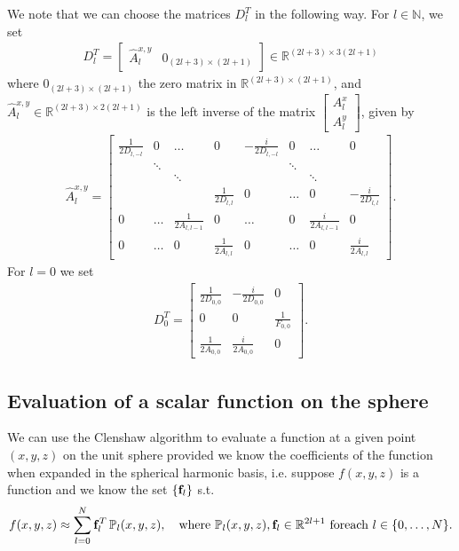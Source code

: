 \documentclass[11pt, oneside]{article}   	%
\newcommand{\R}{\mathbb{R}}
\newcommand{\N}{\mathbb{N}}
\newcommand{\Pl}{\mathbb{P}_l}
\newcommand{\Dlt}{D^T_l}
\begin{document}
We note that we can choose the matrices \(\Dlt\) in the following way. For \(l \in \N\), we set
\begin{align}
\Dlt = \begin{bmatrix}
		\hat{A}^{x,y}_l & 0_{(2l+3)\times(2l+1)}
	  \end{bmatrix} \in \R^{(2l+3)\times3(2l+1)}
\end{align}
where \(0_{(2l+3)\times(2l+1)}\) the zero matrix in \(\R^{(2l+3)\times(2l+1)}\), and \(\hat{A}^{x,y}_l \in \R^{(2l+3)\times2(2l+1)}\) is the left inverse of the matrix \(\begin{bmatrix} A^x_l \\ A^y_l \end{bmatrix}\), given by
\begin{align}
\hat{A}^{x,y}_l = \begin{bmatrix}
		\frac{1}{2D_{l,-l}} & 0 & \hdots & 0 & -\frac{i}{2D_{l,-l}} & 0 & \hdots & 0 \\
		& \ddots & & & & \ddots & & \\
		& & \ddots & & & & \ddots & \\
		& & & \frac{1}{2D_{l,l}} & 0 & \hdots & 0 & -\frac{i}{2D_{l,l}} \\
		0 & \hdots & \frac{1}{2A_{l,l-1}} & 0 & \hdots & 0 & \frac{i}{2A_{l,l-1}} & 0 \\
		0 & \hdots & 0 & \frac{1}{2A_{l,l}} & 0 & \hdots & 0 & \frac{i}{2A_{l,l}}
	  \end{bmatrix}.
\end{align}
For \(l = 0\) we set
\begin{align}
D^T_0 = \begin{bmatrix}
		\frac{1}{2D_{0,0}}&  -\frac{i}{2D_{0,0}} & 0 \\
		0 & 0 & \frac{1}{F_{0,0}} \\
		\frac{1}{2A_{0,0}}&  \frac{i}{2A_{0,0}} & 0 
	     \end{bmatrix}.
\end{align}




\subsection{Evaluation of a scalar function on the sphere}
We can use the Clenshaw algorithm to evaluate a function at a given point \((x,y,z)\) on the unit sphere provided we know the coefficients of the function when expanded in the spherical harmonic basis, i.e. suppose \(f(x,y,z)\) is a function and we know the set \(\{\bold{f}_l\}\) s.t.
\begin{align}
f(x,y,z) \approx \sum^N_{l=0} \bold{f}_l^T \, \Pl (x,y,z), \quad \text{where } \Pl (x,y,z), \bold{f}_l \in \R^{2l+1} \text{ foreach } l \in \{0,\dots,N\}.
\end{align}
\end{document}
